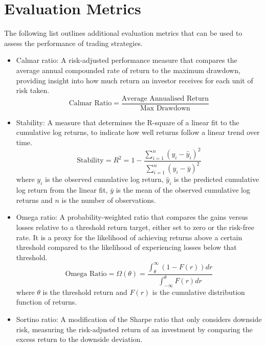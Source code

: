 \chapter{Evaluation Metrics} \label{app:evaluation_metrics}

The following list outlines additional evaluation metrics that can be used to assess the performance of trading strategies.

\begin{itemize}
    \item Calmar ratio: A risk-adjusted performance measure that compares the average annual compounded rate of return to the maximum drawdown, providing insight into how much return an investor receives for each unit of risk taken.
    \begin{equation}
        \text{Calmar Ratio} = \frac{\text{Average Annualised Return}}{\text{Max Drawdown}}
    \end{equation}
    \item Stability: A measure that determines the R-square of a linear fit to the cumulative log returns, to indicate how well returns follow a linear trend over time.
    \begin{equation}
        \text{Stability} = R^2 = 1 - \frac{\sum_{i=1}^{n} (y_i - \hat{y}_i)^2}{\sum_{i=1}^{n} (y_i - \bar{y})^2}
    \end{equation}
    where $y_i$ is the observed cumulative log return, $\hat{y}_i$ is the predicted cumulative log return from the linear fit, $\bar{y}$ is the mean of the observed cumulative log returns and $n$ is the number of observations.
    \item Omega ratio: A probability-weighted ratio that compares the gains versus losses relative to a threshold return target, either set to zero or the risk-free rate. It is a proxy for the likelihood of achieving returns above a certain threshold compared to the likelihood of experiencing losses below that threshold.
    \begin{equation}
        \text{Omega Ratio} = \Omega\left(\theta\right) = \frac{\int_{\theta}^{\infty} \left(1-F(r)\right) dr}{\int_{-\infty}^{\theta} F(r) dr}
    \end{equation}
    where $\theta$ is the threshold return and $F(r)$ is the cumulative distribution function of returns. 
    \item Sortino ratio: A modification of the Sharpe ratio that only considers downside risk, measuring the risk-adjusted return of an investment by comparing the excess return to the downside deviation.

\end{itemize}
